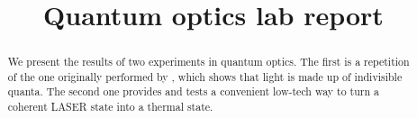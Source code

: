 \documentclass[11pt]{article}
\title{Quantum optics lab report}
\begin{document}
\maketitle

\begin{abstract}
We present the results of two experiments in quantum optics. The first is a repetition of the one originally performed by \textcite[]{grangierExperimentalEvidencePhoton1986} \cite[]{thornObservingQuantumBehavior2004}, which shows that light is made up of indivisible quanta. The second one provides and tests a convenient low-tech way to turn a coherent LASER state into a thermal state.  
\end{abstract}




\printbibliography
\end{document}
